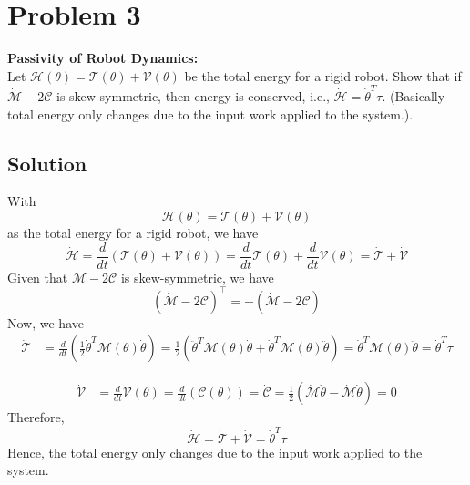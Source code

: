 \section*{Problem 3}
\setcounter{section}{3}
\setcounter{equation}{0}

\textbf{Passivity of Robot Dynamics:} \\
Let \( \mathcal{H}(\theta)=\mathcal{T}(\theta)+\mathcal{V}(\theta) \) be the total energy for a rigid robot.
Show that if \( \dot{\mathcal{M}}-2 \mathcal{C} \) is skew-symmetric, then energy is conserved, i.e., \( \dot{\mathcal{H}}=\dot{\theta}^{T} \tau \).
(Basically total energy only changes due to the input work applied to the system.).

\subsection*{Solution}

With
\begin{equation*}
    \mathcal{H}(\theta)
    =
    \mathcal{T}(\theta)
    +
    \mathcal{V}(\theta)
\end{equation*}
as the total energy for a rigid robot, we have
\begin{equation*}
    \dot{\mathcal{H}}
    =
    \frac{d}{dt} \left( \mathcal{T}(\theta) + \mathcal{V}(\theta) \right)
    =
    \frac{d}{dt} \mathcal{T}(\theta) + \frac{d}{dt} \mathcal{V}(\theta)
    =
    \dot{\mathcal{T}} + \dot{\mathcal{V}}
\end{equation*}
Given that \( \dot{\mathcal{M}} - 2 \mathcal{C} \) is skew-symmetric, we have
\begin{equation*}
    {\left( \dot{\mathcal{M}} - 2 \mathcal{C} \right)}^{\top}
    =
    -\left( \dot{\mathcal{M}} - 2 \mathcal{C} \right)
\end{equation*}
Now, we have
\begin{align*}
    \dot{\mathcal{T}}
     & =
    \frac{d}{dt} \left( \frac{1}{2} \dot{\theta}^{T} \mathcal{M}(\theta) \dot{\theta} \right)
    =
    \frac{1}{2} \left( \ddot{\theta}^{T} \mathcal{M}(\theta) \dot{\theta} + \dot{\theta}^{T} \mathcal{M}(\theta) \ddot{\theta} \right)
    =
    \dot{\theta}^{T} \mathcal{M}(\theta) \ddot{\theta}
    =
    \dot{\theta}^{T} \tau
\end{align*}

\begin{align*}
    \dot{\mathcal{V}}
     & =
    \frac{d}{dt} \mathcal{V}(\theta)
    =
    \frac{d}{dt} \left( \mathcal{C}(\theta) \right)
    =
    \dot{\mathcal{C}}
    =
    \frac{1}{2} \left( \dot{\mathcal{M}} \dot{\theta} - \dot{\mathcal{M}} \dot{\theta} \right)
    =
    0
\end{align*}
Therefore,
\begin{equation*}
    \dot{\mathcal{H}}
    =
    \dot{\mathcal{T}} + \dot{\mathcal{V}}
    =
    \dot{\theta}^{T} \tau
\end{equation*}
Hence, the total energy only changes due to the input work applied to the system.
